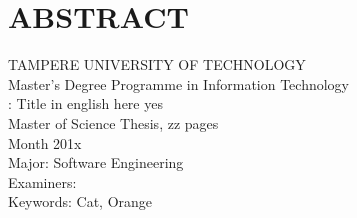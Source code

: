 \newpage
\chapter*{ABSTRACT}
\begin{spacing}{1.0}
\textsf{TAMPERE UNIVERSITY OF TECHNOLOGY}\\
\textsf{Master's Degree Programme in Information Technology}\\
{\bf \textsf{\NIMI}}: \textsf{Title in english here yes}\\
\textsf{Master of Science Thesis, zz pages}\\
\textsf{Month 201x}\\
\textsf{Major: Software Engineering }\\
\textsf{Examiners: \TARKASTAJA}\\
\textsf{Keywords: Cat, Orange}\\

\end{spacing}
